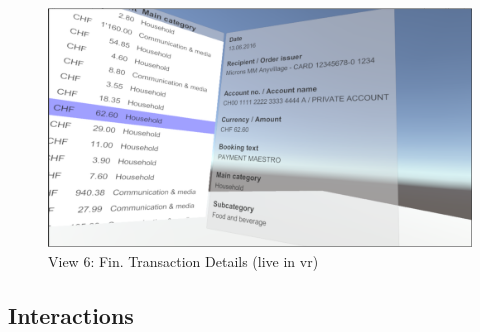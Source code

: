 \begin{figure}[h]
	\begin{center}
		\includegraphics[width=12cm]{03_Figures/08_Development/View6_FinTransactionDetails.png}
		\caption{View 6: Fin. Transaction Details (live in \gls{vr})}
		\label{fig:unityview6}
	\end{center}
\end{figure}


\subsection{Interactions}

